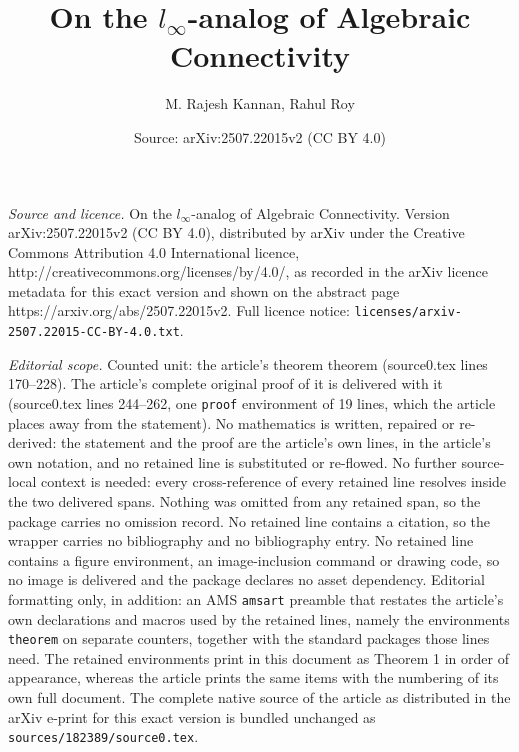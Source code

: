 \documentclass[10pt,a4paper]{amsart}
\title{On the $l_\infty$-analog of Algebraic Connectivity}
\author{M. Rajesh Kannan, Rahul Roy}
\date{Source: arXiv:2507.22015v2 (CC BY 4.0)}
\begin{document}
\maketitle

\noindent\emph{Source and licence.} On the $l_\infty$-analog of Algebraic Connectivity. Version arXiv:2507.22015v2 (CC BY 4.0), distributed by arXiv under the Creative Commons Attribution 4.0 International licence, http://creativecommons.org/licenses/by/4.0/, as recorded in the arXiv licence metadata for this exact version and shown on the abstract page https://arxiv.org/abs/2507.22015v2. Full licence notice: \texttt{licenses/arxiv-2507.22015-CC-BY-4.0.txt}.\par\smallskip

\noindent\textit{Editorial scope.} Counted unit: the article's theorem theorem (source0.tex lines 170--228). The article's complete original proof of it is delivered with it (source0.tex lines 244--262, one \texttt{proof} environment of 19 lines, which the article places away from the statement). No mathematics is written, repaired or re-derived: the statement and the proof are the article's own lines, in the article's own notation, and no retained line is substituted or re-flowed.  No further source-local context is needed: every cross-reference of every retained line resolves inside the two delivered spans.  Nothing was omitted from any retained span, so the package carries no omission record.  No retained line contains a citation, so the wrapper carries no bibliography and no bibliography entry.  No retained line contains a figure environment, an image-inclusion command or drawing code, so no image is delivered and the package declares no asset dependency.  Editorial formatting only, in addition: an AMS \texttt{amsart} preamble that restates the article's own declarations and macros used by the retained lines, namely the environments \texttt{theorem} on separate counters, together with the standard packages those lines need.  The retained environments print in this document as Theorem 1 in order of appearance, whereas the article prints the same items with the numbering of its own full document.  The complete native source of the article as distributed in the arXiv e-print for this exact version is bundled unchanged as \texttt{sources/182389/source0.tex}.
\end{document}
